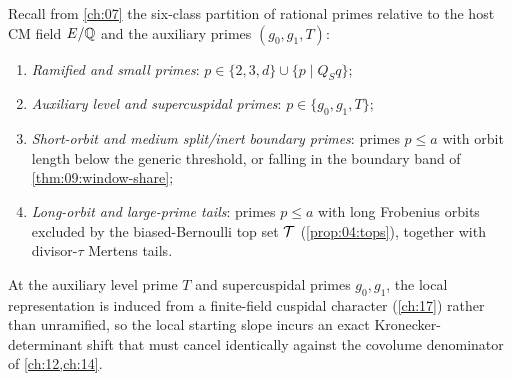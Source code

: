 Recall from \cref{ch:07} the six-class partition of rational primes relative to the host CM field $E/\mathbb{Q}$ and the auxiliary primes $(g_0, g_1, T)$:
\begin{enumerate}[label=\textup{(\Roman*)}]
\item \emph{Ramified and small primes}: $p \in \{2, 3, d\} \cup \{p \mid Q_S q\}$;
\item \emph{Auxiliary level and supercuspidal primes}: $p \in \{g_0, g_1, T\}$;
\item \emph{Short-orbit and medium split/inert boundary primes}: primes $p \le a$ with orbit length below the generic threshold, or falling in the boundary band of \cref{thm:09:window-share};
\item \emph{Long-orbit and large-prime tails}: primes $p \le a$ with long Frobenius orbits excluded by the biased-Bernoulli top set $\mathcal{T}$ (\cref{prop:04:tops}), together with divisor-$\tau$ Mertens tails.
\end{enumerate}

At the auxiliary level prime $T$ and supercuspidal primes $g_0, g_1$, the local representation is induced from a finite-field cuspidal character (\cref{ch:17}) rather than unramified, so the local starting slope incurs an exact Kronecker-determinant shift that must cancel identically against the covolume denominator of \cref{ch:12,ch:14}.

